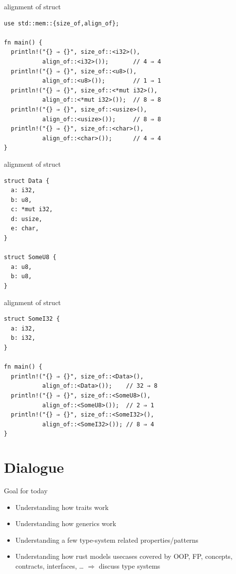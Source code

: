 \documentclass{beamer}
\begin{document}
\begin{frame}[fragile]{alignment of struct}
  \begin{verbatim}
use std::mem::{size_of,align_of};

fn main() {
  println!("{} ⇒ {}", size_of::<i32>(),
           align_of::<i32>());       // 4 ⇒ 4
  println!("{} ⇒ {}", size_of::<u8>(),
           align_of::<u8>());        // 1 ⇒ 1
  println!("{} ⇒ {}", size_of::<*mut i32>(),
           align_of::<*mut i32>());  // 8 ⇒ 8
  println!("{} ⇒ {}", size_of::<usize>(),
           align_of::<usize>());     // 8 ⇒ 8
  println!("{} ⇒ {}", size_of::<char>(),
           align_of::<char>());      // 4 ⇒ 4
}
  \end{verbatim}
\end{frame}

\begin{frame}[fragile]{alignment of struct}
  \begin{verbatim}
struct Data {
  a: i32,
  b: u8,
  c: *mut i32,
  d: usize,
  e: char,
}

struct SomeU8 {
  a: u8,
  b: u8,
}
  \end{verbatim}
\end{frame}

\begin{frame}[fragile]{alignment of struct}
  \begin{verbatim}
struct SomeI32 {
  a: i32,
  b: i32,
}

fn main() {
  println!("{} ⇒ {}", size_of::<Data>(),
           align_of::<Data>());    // 32 ⇒ 8
  println!("{} ⇒ {}", size_of::<SomeU8>(),
           align_of::<SomeU8>());  // 2 ⇒ 1
  println!("{} ⇒ {}", size_of::<SomeI32>(),
           align_of::<SomeI32>()); // 8 ⇒ 4
}
  \end{verbatim}
\end{frame}

\section{Dialogue}

\begin{frame}[fragile]{Goal for today}
  \begin{itemize}
    \item Understanding how traits work
    \item Understanding how generics work
    \item Understanding a few type-system related properties/patterns
    \item Understanding how rust models usecases covered by OOP, FP, concepts, contracts, interfaces, … $\Rightarrow$ discuss type systems
  \end{itemize}
\end{frame}
\end{document}
